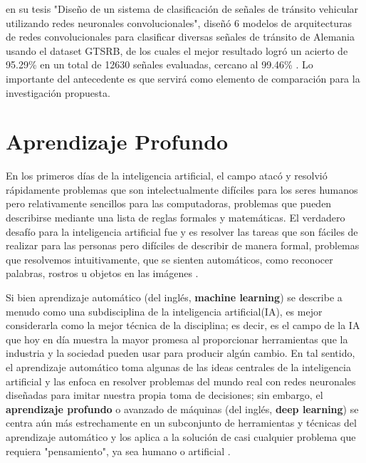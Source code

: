 		\citep{Ayuque2016} en su tesis "Diseño de un sistema de clasificación de señales de tránsito vehicular utilizando redes neuronales convolucionales", diseñó 6 modelos de arquitecturas de redes convolucionales para clasificar diversas señales de tránsito de Alemania usando el dataset GTSRB, de los cuales el mejor resultado logró un acierto de 95.29\% en un total de 12630 señales evaluadas, cercano al 99.46\% \citep{Ciresan}. Lo importante del antecedente es que servirá como elemento de comparación para la investigación propuesta. 
		


\section{Aprendizaje Profundo} 
	En los primeros días de la inteligencia artificial, el campo atacó y resolvió rápidamente problemas que son intelectualmente difíciles para los seres humanos pero relativamente sencillos para las computadoras, problemas que pueden describirse mediante una lista de reglas formales y matemáticas. El verdadero desafío para la inteligencia artificial fue y es resolver las tareas que son fáciles de realizar para las personas pero difíciles de describir de manera formal, problemas que resolvemos intuitivamente, que se sienten automáticos, como reconocer palabras, rostros u objetos en las imágenes \citep{Goodfellow-et-al-2016}.

	\vskip 0.4cm  
	Si bien aprendizaje automático (del inglés, {\bf machine learning}) se describe a menudo como una subdisciplina de la inteligencia artificial(IA), es mejor considerarla como la mejor técnica de la disciplina; es decir, es el campo de la IA que hoy en día muestra la mayor promesa al proporcionar herramientas que la industria y la sociedad pueden usar para producir algún cambio. En tal sentido, el aprendizaje automático toma algunas de las ideas centrales de la inteligencia artificial y las enfoca en resolver problemas del mundo real con redes neuronales diseñadas para imitar nuestra propia toma de decisiones; sin embargo, el {\bf aprendizaje profundo} o avanzado de máquinas (del inglés, {\bf deep learning}) se centra aún más estrechamente en un subconjunto de herramientas y técnicas del aprendizaje automático y los aplica a la solución de casi cualquier problema que requiera "pensamiento", ya sea humano o artificial \citep{Goodfellow-et-al-2016}.

